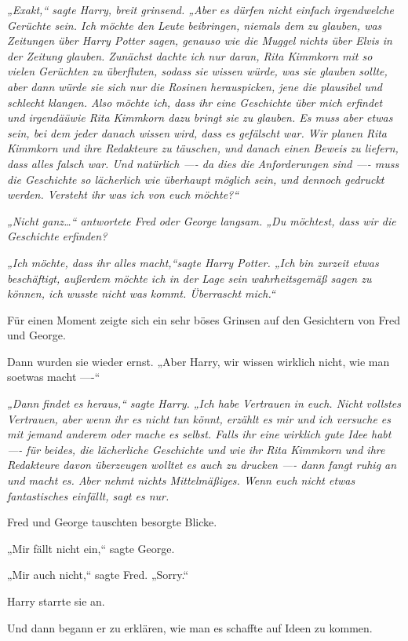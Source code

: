 {\emph{„Exakt,“ sagte Harry, breit grinsend. „Aber es dürfen nicht einfach irgendwelche Gerüchte sein. Ich möchte den Leute beibringen, niemals dem zu glauben, was Zeitungen über Harry Potter sagen, genauso wie die Muggel nichts über Elvis in der Zeitung glauben. Zunächst dachte ich nur daran, Rita Kimmkorn mit so vielen Gerüchten zu überfluten, sodass sie wissen würde, was sie glauben sollte, aber dann würde sie sich nur die Rosinen herauspicken, jene die plausibel und schlecht klangen. Also möchte ich, dass ihr eine Geschichte über mich erfindet und irgendäüwie Rita Kimmkorn dazu bringt sie zu glauben. Es muss aber etwas sein, bei dem jeder danach wissen wird, dass es gefälscht war. Wir planen Rita Kimmkorn und ihre Redakteure zu täuschen, und danach einen Beweis zu liefern, dass alles falsch war. Und natürlich ---- da dies die Anforderungen sind ---- muss die Geschichte so lächerlich wie überhaupt möglich sein, und dennoch gedruckt werden. Versteht ihr was ich von euch möchte?“}

\emph{„Nicht ganz…“ antwortete Fred oder George langsam. „Du möchtest, dass wir die Geschichte erfinden?}

\emph{„Ich möchte, dass ihr alles macht,“sagte Harry Potter. „Ich bin zurzeit etwas beschäftigt, außerdem möchte ich in der Lage sein wahrheitsgemäß sagen zu können, ich wusste nicht was kommt. Überrascht mich.“}

Für einen Moment zeigte sich ein sehr böses Grinsen auf den Gesichtern von Fred und George.

Dann wurden sie wieder ernst. „Aber Harry, wir wissen wirklich nicht, wie man soetwas macht ----“

\emph{„Dann findet es heraus,“ sagte Harry. „Ich habe Vertrauen in euch. Nicht vollstes Vertrauen, aber wenn ihr es nicht tun könnt, erzählt es mir und ich versuche es mit jemand anderem oder mache es selbst. Falls ihr eine wirklich gute Idee habt ---- für beides, die lächerliche Geschichte und wie ihr Rita Kimmkorn und ihre Redakteure davon überzeugen wolltet es auch zu drucken ---- dann fangt ruhig an und macht es. Aber nehmt nichts Mittelmäßiges. Wenn euch nicht etwas fantastisches einfällt, sagt es nur.}

Fred und George tauschten besorgte Blicke.

„Mir fällt nicht ein,“ sagte George.

„Mir auch nicht,“ sagte Fred. „Sorry.“

Harry starrte sie an.

Und dann begann er zu erklären, wie man es schaffte auf Ideen zu kommen.

}

